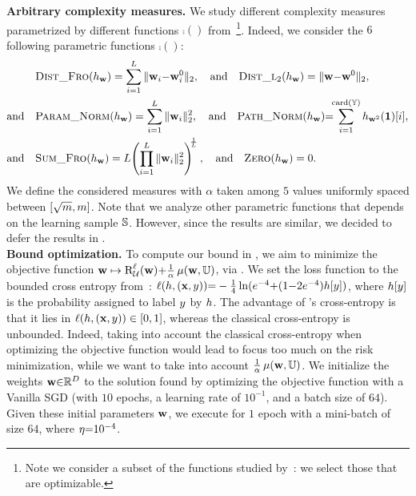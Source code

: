 \textbf{Arbitrary complexity measures.} 
We study different complexity measures parametrized by different functions $\comp()$ from~\citet[Sec.~C]{JiangNeyshaburMobahiKrishnanBengio2020}\footnote{Note we consider a subset of the functions studied by~\citeauthor{JiangNeyshaburMobahiKrishnanBengio2020}: we select those that are optimizable.}.
Indeed, we consider the $6$ following parametric functions $\comp()$:
\begin{align*}
  &\distfro(\h_\wbf) = \sum_{i=1}^{L}\|\wbf_{i}{-}\wbf^{0}_{i}\|_{2}, \quad\text{and}\quad \distltwo(\h_\wbf) = \|\wbf{-}\wbf^{0}\|_{2},\\
  \text{and}\quad &\paramnorm(\h_\wbf) = \sum_{i=1}^{L}\|\wbf_{i}\|_{2}^{2}, \quad\text{and}\quad \pathnorm(\h_\wbf){=}\!\!\sum_{i=1}^{\card(\Y)}h_{\wbf^2}(\onebf)[i],\\
  \text{and}\quad &\sumfro(\h_\wbf) = L\!\left(\prod_{i=1}^{L}\|\wbf_{i}\|_{2}^{2}\right)^{\!\!\frac1L}, \quad\text{and}\quad \zero(\h_\wbf) = 0.
\end{align*}
We define the considered measures with $\alpha$ taken among $5$ values uniformly spaced between $[\sqrt{\m}, \m]$. 
Note that we analyze other parametric functions that depends on the learning sample $\S$. 
However, since the results are similar, we decided to defer the results in .\\

\textbf{Bound optimization.}
To compute our bound in , we aim to minimize the objective function $\wbf \mapsto \RiskLoss_{\dbatch}(\wbf){+}\frac{1}{\alpha}\comp(\wbf, \batch)$, via .
We set the loss function to the bounded cross entropy from~\citet{DziugaiteRoy2018}: $\ell(\h, (\x,\y)) {=} -\frac{1}{4}\ln(e^{-4}{+}(1{-}2e^{-4})h[y])$, where $\h[\y]$ is the probability assigned to label $\y$ by $\h$.
The advantage of \citet{DziugaiteRoy2018}'s cross-entropy is that it lies in $\ell(\h, (\x,\y)) \in [0,1]$, whereas the classical cross-entropy is unbounded. 
Indeed, taking into account the classical cross-entropy when optimizing the objective function would lead to focus too much on the risk minimization, while we want to take into account $\frac{1}{\alpha}\comp({\bf w}, \batch)$.
We initialize the weights $\wbf{\in}\Rbb^D$ to the solution found by optimizing the objective function with a Vanilla SGD (with $10$ epochs, a learning rate of $10^{-1}$, and a batch size of $64$).
Given these initial parameters $\wbf$, we execute  for $1$ epoch with a mini-batch of size $64$, where $\lr{=}10^{-4}$.

